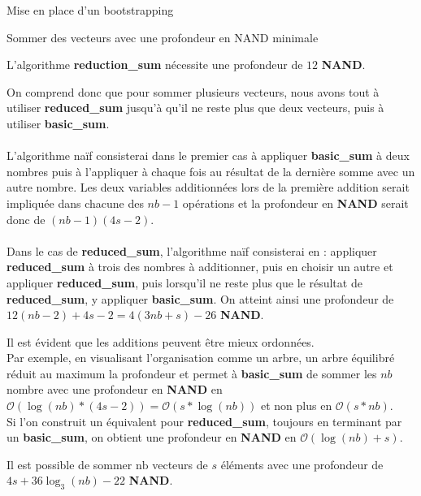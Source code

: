 \begin{section}{Mise en place d'un bootstrapping}
\begin{subsection}{Sommer des vecteurs avec une profondeur en NAND minimale}
\begin{prop}
	L'algorithme \textbf{reduction\_sum} nécessite une profondeur de $12$ \textbf{NAND}.
\end{prop}

On comprend donc que pour sommer plusieurs vecteurs, nous avons tout à utiliser 
\textbf{reduced\_sum} jusqu'à qu'il ne reste plus que deux vecteurs, puis à
utiliser \textbf{basic\_sum}.



\paragraph{}
L'algorithme naïf consisterai dans le premier cas à appliquer
	\textbf{basic\_sum} à deux nombres puis à l'appliquer à chaque fois au
	résultat de la dernière somme avec un autre nombre. Les deux variables
	additionnées lors de la première addition serait impliquée dans chacune
	des $nb-1$ opérations et la profondeur en \textbf{NAND} serait donc de
	$(nb-1)(4 s - 2)$. 
\paragraph{}
Dans le cas de \textbf{reduced\_sum}, l'algorithme naïf consisterai en :
	appliquer \textbf{reduced\_sum} à trois des nombres à additionner, puis
	en choisir un autre et appliquer \textbf{reduced\_sum}, puis lorsqu'il
	ne reste plus que le résultat de \textbf{reduced\_sum}, y appliquer
	\textbf{basic\_sum}. On atteint ainsi une profondeur de $12(nb - 2) + 4
	s- 2 = 4(3nb + s) - 26$ \textbf{NAND}.

Il est évident que les additions peuvent être mieux ordonnées. \\
Par exemple, en visualisant l'organisation comme un arbre, un arbre équilibré
	réduit au maximum la profondeur et permet à \textbf{basic\_sum} de
	sommer les $nb$ nombre avec une profondeur en \textbf{NAND} en
	$\mathcal{O}(\log(nb) * (4s - 2)) = \mathcal{O}(s * \log(nb))$ et non
	plus en $\mathcal{O}(s * nb)$. \\
Si l'on construit un équivalent pour \textbf{reduced\_sum}, toujours en
terminant par un \textbf{basic\_sum}, on obtient une profondeur en
\textbf{NAND} en $\mathcal{O}(\log(nb) + s)$.

\begin{prop}
	Il est possible de sommer $\text{nb}$ vecteurs de $s$ éléments avec une profondeur de $4s + 36\log_3(nb) -22$ \textbf{NAND}.
\end{prop}


\end{subsection}
\end{section}

